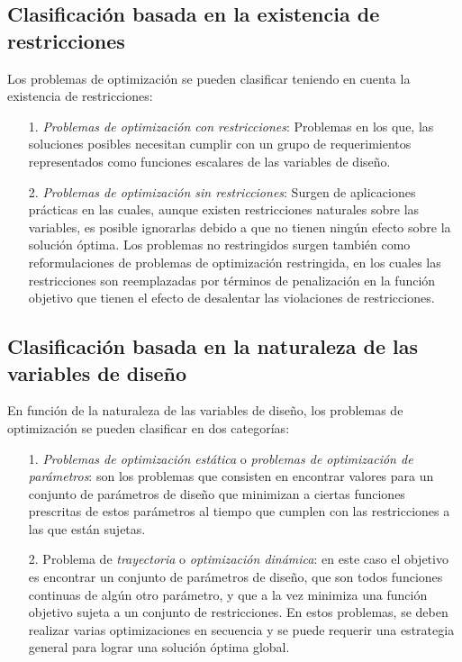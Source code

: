 \subsection{Clasificación basada en la existencia de restricciones}
Los problemas de optimización se pueden clasificar teniendo en cuenta la existencia de restricciones:
\begin{itemize}
\item [1.]  \textit{Problemas de optimización con restricciones}: Problemas en los que, las soluciones posibles necesitan cumplir con un grupo de requerimientos representados como funciones escalares de las variables de diseño.
\item [2.]  \textit{Problemas de optimización sin restricciones}: Surgen de aplicaciones prácticas en las cuales, aunque existen restricciones naturales sobre las variables, es posible ignorarlas debido a que no tienen ningún efecto sobre la solución óptima. Los problemas no restringidos surgen también como reformulaciones de problemas de optimización restringida, en los cuales las restricciones son reemplazadas por términos de penalización en la función objetivo que tienen el efecto de desalentar las violaciones de restricciones.
\end{itemize}

\subsection{Clasificación basada en la naturaleza de las variables de diseño} 
En función de la naturaleza de las variables de diseño, los problemas de optimización se pueden clasificar en dos categorías:
\begin{itemize}
\item[1.]  \textit{Problemas de optimización estática} o \textit{problemas de optimización de parámetros}: son los problemas que consisten en encontrar valores para un conjunto de parámetros de diseño que minimizan a ciertas funciones prescritas de estos parámetros al tiempo que cumplen con las restricciones a las que están sujetas. 
\item[2.] Problema de \textit{trayectoria} o \textit{optimización dinámica}: en este caso el objetivo es encontrar un conjunto de parámetros de diseño, que son todos funciones continuas de algún otro parámetro, y que a la vez minimiza una función objetivo sujeta a un conjunto de restricciones. En estos problemas, se deben realizar varias optimizaciones en secuencia y se puede requerir una estrategia general para lograr una solución óptima global.
\end{itemize}
